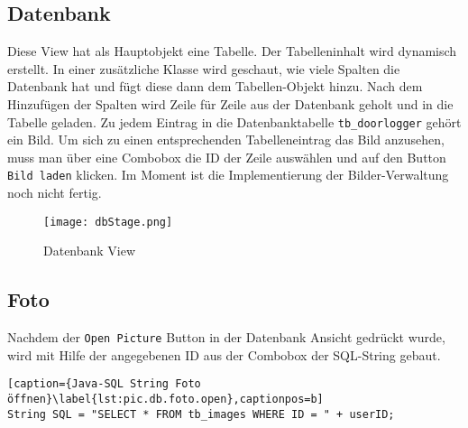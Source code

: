 \subsection{Datenbank}
\label{subsec.datenbank}
Diese View hat als Hauptobjekt eine Tabelle. Der Tabelleninhalt wird dynamisch erstellt. In einer zusätzliche Klasse wird geschaut, wie viele Spalten die Datenbank hat und fügt diese dann dem Tabellen-Objekt hinzu. Nach dem Hinzufügen der Spalten wird Zeile für Zeile aus der Datenbank geholt und in die Tabelle geladen. Zu jedem Eintrag in die Datenbanktabelle \texttt{tb\_doorlogger} gehört ein Bild. Um sich zu einen entsprechenden Tabelleneintrag das Bild anzusehen, muss man über eine Combobox die ID der Zeile auswählen und auf den Button \texttt{Bild laden} klicken. Im Moment ist die Implementierung der Bilder-Verwaltung noch nicht fertig. %

\begin{figure}[h]
  \begin{center}
    \texttt{[image: dbStage.png]}
  		  \caption{Datenbank View}
     \label{fig.DatenbankFenster}
  \end{center}
\end{figure}

\subsection{Foto}
\label{subsec.foto}
Nachdem der \texttt{Open Picture} Button in der Datenbank Ansicht gedrückt wurde, wird mit Hilfe der angegebenen ID aus der Combobox der SQL-String gebaut.

\begin{lstlisting}[caption={Java-SQL String Foto öffnen}\label{lst:pic.db.foto.open},captionpos=b]
String SQL = "SELECT * FROM tb_images WHERE ID = " + userID;
\end{lstlisting}

